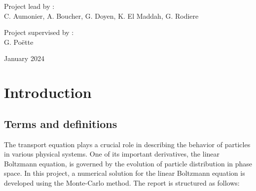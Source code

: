 \documentclass[a4paper, 11pt]{article}
\begin{document}
\begin{titlepage}
		\bigskip
		\bigskip
		
		\centering
		\Large{Project lead by :} \\
		\Large{C. Aumonier, A. Boucher, G. Doyen, K. El Maddah, G. Rodiere}
		
		
		\vfill\vfill\vfill %
		{\Large  Project supervised by :}\\
		\Large{G. Poëtte}
		
		\vspace{0,5cm}
		
		{\large January 2024} %
		
		
		
		
		\vfill %
		
	\end{titlepage}
	
\tableofcontents

\newpage
	
\section{Introduction}


	
\subsection{Terms and definitions}
	
	The transport equation plays a crucial role in describing the behavior of particles in various physical systems. One of its important derivatives, the linear Boltzmann equation, is governed by the evolution of particle distribution in phase space. In this project, a numerical solution for the linear Boltzmann equation is developed using the Monte-Carlo method. The report is structured as follows:
	
\end{document}
